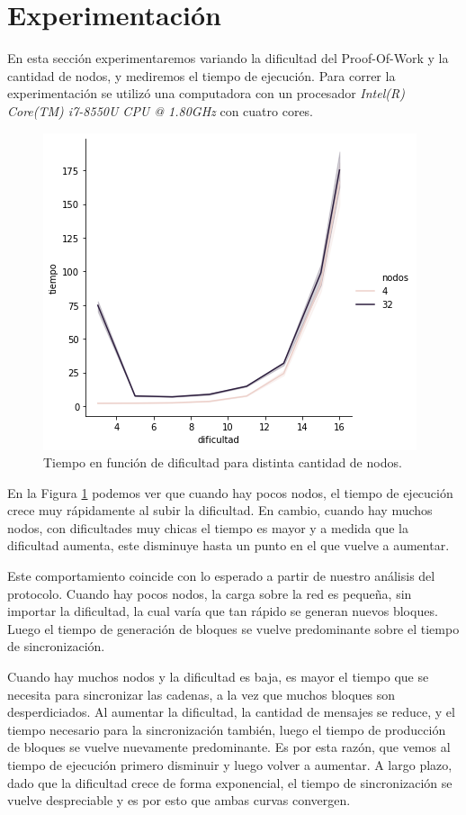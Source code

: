 
\section{Experimentación}
En esta sección experimentaremos variando la dificultad del Proof-Of-Work y la cantidad de nodos, y mediremos el tiempo de ejecución. Para correr la experimentación se utilizó una computadora con un procesador \textit{Intel(R) Core(TM) i7-8550U CPU @ 1.80GHz} con cuatro cores.

\begin{figure}[H]
	\centering
	\includegraphics[width=0.7\linewidth]{img/grafico}
	\caption{Tiempo en función de dificultad para distinta cantidad de nodos.}
	\label{fig:grafico}
\end{figure}

En la Figura \ref{fig:grafico} podemos ver que cuando hay pocos nodos, el tiempo de ejecución crece muy rápidamente al subir la dificultad. En cambio, cuando hay muchos nodos, con dificultades muy chicas el tiempo es mayor y a medida que la dificultad aumenta, este disminuye hasta un punto en el que vuelve a aumentar.

Este comportamiento coincide con lo esperado a partir de nuestro análisis del protocolo. Cuando hay pocos nodos, 
la carga sobre la red es pequeña, sin importar la dificultad,
la cual varía que tan rápido se generan nuevos bloques. Luego el tiempo de generación de bloques se vuelve 
predominante sobre el tiempo de sincronización.

Cuando hay muchos nodos y la dificultad es baja,
es mayor el tiempo que se necesita para sincronizar las cadenas, a la vez que muchos bloques son 
desperdiciados. Al aumentar la dificultad, la cantidad de mensajes se reduce, y el tiempo necesario
para la sincronización también, luego el tiempo de producción de bloques se vuelve nuevamente predominante.
Es por esta razón, que vemos al tiempo de ejecuci\'on primero disminuir y luego volver a aumentar. A largo plazo, dado que la dificultad crece de forma exponencial, el tiempo de sincronizaci\'on se vuelve despreciable y es por esto que ambas curvas convergen.